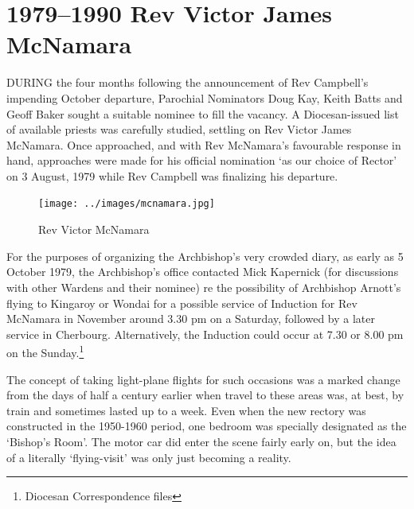 \balance


\printendnotes[custom]
\setcounter{endnote}{0}
\chapter{1979--1990 Rev Victor James McNamara}
\nobalance


\lettrine[lines=3]{D}{URING}
 the four months following the announcement of Rev Campbell's impending October departure, Parochial Nominators Doug Kay, Keith Batts and Geoff Baker sought a suitable nominee to fill the vacancy. A Diocesan-issued list of available priests was carefully studied, settling on Rev Victor James McNamara. Once approached, and with Rev McNamara's favourable response in hand, approaches were made for his official nomination `as our choice of Rector' on 3 August, 1979 while Rev Campbell was finalizing his departure.







\begin{figure}
\begin{center}
\texttt{[image: ../images/mcnamara.jpg]}
\caption{Rev Victor McNamara}
\end{center}
\end{figure}




For the purposes of organizing the Archbishop's very crowded diary, as early as 5 October 1979, the Archbishop's office contacted Mick Kapernick (for discussions with other Wardens and their nominee) re the possibility of Archbishop Arnott's flying to Kingaroy or Wondai for a possible service of Induction for Rev McNamara in November around 3.30 pm on a Saturday, followed by a later service in Cherbourg. Alternatively, the Induction could occur at 7.30 or 8.00 pm on the Sunday.\footnote{Diocesan Correspondence files}


The concept of taking light-plane flights for such occasions was a marked change from the days of half a century earlier when travel to these areas was, at best, by train and sometimes lasted up to a week. Even when the new rectory was constructed in the 1950-1960 period, one bedroom was specially designated as the `Bishop's Room'. The motor car did enter the scene fairly early on, but the idea of a literally `flying-visit' was only just becoming a reality.



